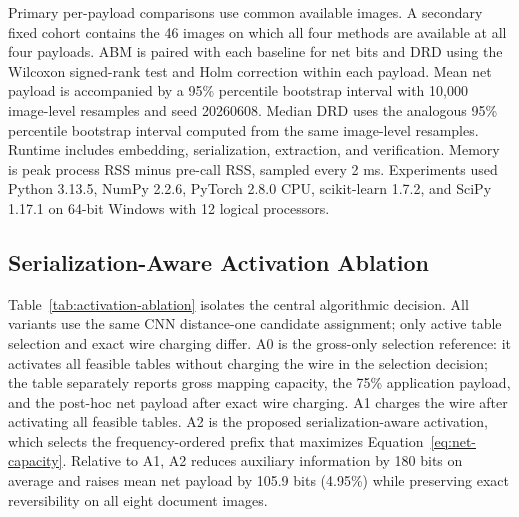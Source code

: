 \documentclass[a4paper,fleqn]{cas-dc}
\newcommand{\RevisionAddBegin}{\begingroup}
\newcommand{\RevisionAddEnd}{\endgroup}
\newcommand{\RevisionAddBegin}{\begingroup\color{revisionblue}}
\newcommand{\RevisionAddEnd}{\endgroup}
\begin{document}
Primary per-payload comparisons use common available images. A secondary fixed
cohort contains the 46 images on which all four methods are available at all
four payloads. ABM is paired with each baseline for net bits and DRD using the
Wilcoxon signed-rank test and Holm correction within each payload. Mean net
payload is accompanied by a 95\% percentile bootstrap interval with 10,000
\RevisionAddBegin
image-level resamples and seed 20260608. Median DRD uses the analogous 95\%
percentile bootstrap interval computed from the same image-level resamples.
Runtime includes embedding,
\RevisionAddEnd
serialization, extraction, and verification. Memory is peak process RSS minus
pre-call RSS, sampled every 2 ms. Experiments used Python 3.13.5, NumPy 2.2.6,
PyTorch 2.8.0 CPU, scikit-learn 1.7.2, and SciPy 1.17.1 on 64-bit Windows with
12 logical processors.

\subsection{Serialization-Aware Activation Ablation}
\label{subsec:component-ablations}

Table~\ref{tab:activation-ablation} isolates the central algorithmic decision.
All variants use the same CNN distance-one candidate assignment; only active
table selection and exact wire charging differ. A0 is the gross-only selection
reference: it activates all feasible tables without charging the wire in the
selection decision; the table separately reports gross mapping capacity, the
75\% application payload, and the post-hoc net payload after exact wire
charging. A1 charges the wire after activating all feasible tables. A2 is the
proposed
serialization-aware activation, which selects the frequency-ordered prefix that
maximizes Equation~\ref{eq:net-capacity}. Relative to A1, A2 reduces auxiliary
information by 180 bits on average and raises mean net payload by 105.9 bits
(4.95\%) while preserving exact reversibility on all eight document images.

\begin{table}[t]
\centering
\caption{Central ablation of serialization-aware mapping activation on the
eight document images. Values are means in bits except DRD; the post-hoc value
in A0 is the net payload obtained when the exact wire is charged after the
gross-only selection.}
\label{tab:activation-ablation}
\end{table}
\end{document}
